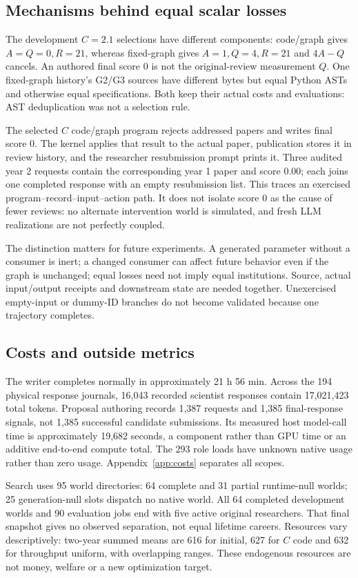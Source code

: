 \FloatBarrier
\subsection{Mechanisms behind equal scalar losses}
The development $C=2.1$ selections have different components: code/graph gives
$A=Q=0,R=21$, whereas fixed-graph gives $A=1,Q=4,R=21$ and $4A-Q$ cancels.
An authored final score 0 is not the original-review measurement $Q$.
One fixed-graph history's G2/G3 sources have different bytes but equal Python
ASTs and otherwise equal specifications. Both keep their actual costs and
evaluations: AST deduplication was not a selection rule.

The selected $C$ code/graph program rejects addressed papers and writes final
score 0. The kernel applies that result to the actual paper, publication stores
it in review history, and the researcher resubmission prompt prints it. Three
audited year 2 requests contain the corresponding year 1 paper and score 0.00;
each joins one completed response with an empty resubmission list.
This traces an exercised program--record--input--action path. It does not
isolate score 0 as the cause of fewer reviews: no alternate intervention world
is simulated, and fresh LLM realizations are not perfectly coupled.

The distinction matters for future experiments. A generated parameter without
a consumer is inert; a changed consumer can affect future behavior even if
the graph is unchanged; equal losses need not imply equal institutions.
Source, actual input/output receipts and downstream state are needed together.
Unexercised empty-input or dummy-ID branches do not become validated because
one trajectory completes.

\subsection{Costs and outside metrics}
The writer completes normally in approximately 21 h 56 min. Across the 194
physical response journals, 16,043 recorded scientist responses contain
17,021,423 total tokens. Proposal authoring records 1,387 requests and 1,385
final-response signals, not 1,385 successful candidate submissions. Its measured
host model-call time is approximately 19,682 seconds, a component rather than
GPU time or an additive end-to-end compute total. The 293 role loads have
unknown native usage rather than zero usage. Appendix~\ref{app:costs} separates
all scopes.

Search uses 95 world directories: 64 complete and 31 partial runtime-null worlds;
25 generation-null slots dispatch no native world. All 64 completed development
worlds and 90 evaluation jobs end with five active original researchers.
That final snapshot gives no observed separation, not equal lifetime careers.
Resources vary descriptively: two-year summed means are 616 for initial, 627
for $C$ code and 632 for throughput uniform, with overlapping ranges.
These endogenous resources are not money, welfare or a new optimization target.

